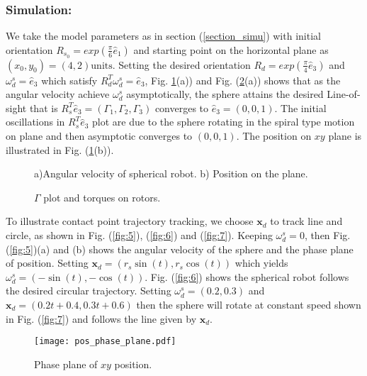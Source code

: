 \documentclass{ifacconf}
\begin{document}
\subsubsection*{Simulation:}
We take the model parameters as in section (\ref{section_simu}) with initial orientation $R_{s_{0}} = exp(\frac{\pi }{6} \hat{e}_{1}) $ and starting point on the horizontal plane as $(x_{0},y_{0}) = (4,2)\mbox{units}$. Setting the desired orientation $R_{d} = exp(\frac{\pi}{4} \hat{e}_{3})$ and $\omega_{d}^{s} = \hat{e}_{3}$ which satisfy $R_{d}^{T}\omega_{d}^{s}=\hat{e}_{3}$, Fig. \ref{position_track1}(a)) and Fig. (\ref{fig:gam}(a)) shows that as the angular velocity achieve $\omega_{d}^{s}$ asymptotically, the sphere attains the desired Line-of-sight that is $R_{s}^{T}\hat{e}_{3}= (\Gamma_{1},\Gamma_{2},\Gamma_{3})$ converges to $\hat{e}_{3}=(0,0,1)$. The initial oscillations in $R_{s}^{T}\hat{e}_{3}$ plot are due to the sphere rotating in the spiral type motion on plane and then asymptotic converges to $(0,0,1)$. The position on $xy$ plane is illustrated in Fig. (\ref{position_track1}(b)).
\begin{figure}[h]
\centering
		\caption{a)Angular velocity of spherical robot. b) Position on the plane.}				
		\label{position_track1}				
\end{figure}
\begin{figure}[h]
\centering
			\caption{ $\Gamma$ plot and torques on rotors.}				
				\label{fig:gam}
\end{figure}
To illustrate contact point trajectory tracking, we choose $\mathbf{x}_{d}$ to track line and circle, as shown in Fig. (\ref{fig:5}), (\ref{fig:6}) and (\ref{fig:7}). Keeping $\omega_{d}^{s}=0$, then Fig. (\ref{fig:5})(a) and (b) shows the angular velocity of the sphere and the phase plane of position. Setting $\mathbf{x}_{d} = (r_{s}\sin (t),r_s \cos (t))$ which yields $\omega_{d}^{s}=(-\sin(t),-\cos(t))$. Fig. (\ref{fig:6}) shows the spherical robot follows the desired circular trajectory. Setting $\omega_{d}^{s}= (0.2,0.3)$ and $\mathbf{x}_{d} = (0.2t + 0.4,0.3t+0.6)$ then the sphere will rotate at constant speed shown in Fig. (\ref{fig:7}) and follows the line given by $\mathbf{x}_{d}$.
\begin{figure}[h]
\centering
\texttt{[image: pos\_phase\_plane.pdf]}
\caption{Phase plane of $xy$ position.}			
\label{fig:4}
\end{figure}
\end{document}
